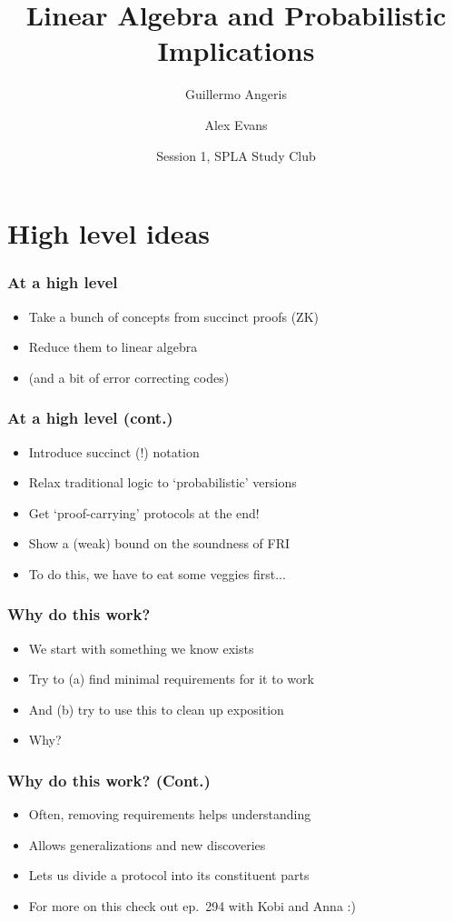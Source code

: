 \documentclass{beamer}
\title{Linear Algebra and Probabilistic Implications}
\author{Guillermo Angeris \and Alex Evans}
\date{Session 1, SPLA Study Club}
\begin{document}
	\begin{frame}
		\titlepage
	\end{frame}
    
    \section{High level ideas}
    \begin{frame}
        \frametitle{At a high level}
        \begin{itemize}\itemsep=12pt
            \item Take a bunch of concepts from succinct proofs (ZK)
            \item Reduce them to linear algebra
            \item (and a bit of error correcting codes)
        \end{itemize}
    \end{frame}

    \begin{frame}
        \frametitle{At a high level (cont.)}
        \begin{itemize}\itemsep=12pt
            \item Introduce succinct (!) notation
            \item Relax traditional logic to `probabilistic' versions
            \item Get `proof-carrying' protocols at the end!
            \item Show a (weak) bound on the soundness of FRI
            \pause
            \item To do this, we have to eat some veggies first...
        \end{itemize}
    \end{frame}
    \begin{frame}
        \frametitle{Why do this work?}
        \begin{itemize}\itemsep=12pt
            \pause
            \item We start with something we know exists
            \item Try to (a) find minimal requirements for it to work
            \item And (b) try to use this to clean up exposition
            \pause
            \item Why?
        \end{itemize}
    \end{frame}

    \begin{frame}
        \frametitle{Why do this work? (Cont.)}
        \begin{itemize}\itemsep=12pt
            \item Often, removing requirements helps understanding
            \item Allows generalizations and new discoveries
            \item Lets us divide a protocol into its constituent parts
            \pause
            \item For more on this check out ep.\ 294 with Kobi and Anna :)
        \end{itemize}
    \end{frame}
\end{document}

